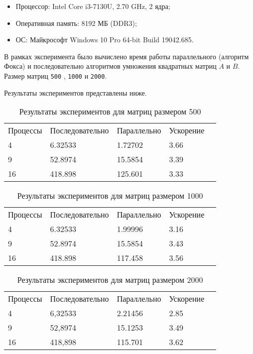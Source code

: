 \documentclass{report}
\begin{document}
\begin{itemize}
\item Процессор: Intel Core i3-7130U, 2.70 GHz, 2 ядра;
\item Оперативная память: 8192 МБ (DDR3);
\item ОС: Майкрософт Windows 10 Pro 64-bit Build 19042.685.
\end{itemize}

\par В рамках эксперимента было вычислено время работы параллельного (алгоритм Фокса)
и последовательно алгоритмов умножения квадратных матриц {\itshape $A$} и {\itshape $B$}. Размер матриц \verb|500| , \verb|1000| и \verb|2000|.
\par Результаты экспериментов представлены ниже.

\begin{table}[!h]
\caption{Результаты экспериментов для матриц размером 500}
\centering
\begin{tabular}{lllll}
Процессы & Последовательно & Параллельно & Ускорение  \\
4        & 6.32533         & 1.72702     & 3.66       \\
9        & 52.8974         & 15.5854     & 3.39       \\
16       & 418.898         & 125.601     & 3.33       
\end{tabular}
\end{table}

\begin{table}[!h]
\caption{Результаты экспериментов для матриц размером 1000}
\centering
\begin{tabular}{lllll}
Процессы & Последовательно & Параллельно & Ускорение  \\
4        & 6.32533         & 1.99996     & 3.16       \\
9        & 52.8974         & 15.5854     & 3.43       \\
16       & 418.898         & 117.458     & 3.56       
\end{tabular}
\end{table}

\begin{table}[!h]
\caption{Результаты экспериментов для матриц размером 2000}
\centering
\begin{tabular}{lllll}
Процессы & Последовательно & Параллельно & Ускорение  \\
4        & 6,32533         & 2.21456     & 2.85       \\
9        & 52,8974         & 15.1253     & 3.49       \\
16       & 418,898         & 115.701     & 3.62       
\end{tabular}
\end{table}
\end{document}
